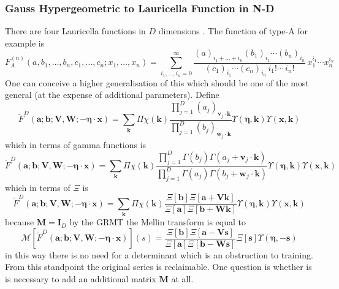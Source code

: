 \documentclass[journal=jcisd8,manuscript=article,layout=onecolumn,pdftex,floatfix,amsmath,amssymb,10pt]{achemso}
\begin{document}
\subsubsection{Gauss Hypergeometric to Lauricella Function in N-D}
There are four Lauricella functions in $D$ dimensions \cite{}. The function of type-A for example is
\begin{equation}
F_A^{(n)}(a, b_1,\ldots,b_n, c_1,\ldots,c_n; x_1,\ldots,x_n) = 
\sum_{i_1,\ldots,i_n=0}^{\infty} \frac{(a)_{i_1+\ldots+i_n} (b_1)_{i_1} \cdots (b_n)_{i_n}} {(c_1)_{i_1} \cdots (c_n)_{i_n} \,i_1! \cdots \,i_n!} \,x_1^{i_1} \cdots x_n^{i_n}
\end{equation}
One can conceive a higher generalisation of this which should be one of the most general (at the expense of additional parameters). Define
\begin{equation}
\tilde{F}^{D}(\mathbf{a};\mathbf{b};\mathbf{V,W};-\boldsymbol\eta \cdot\mathbf{x}) = \sum_{\mathbf{k}} \Pi\chi(\mathbf{k})\frac{\prod_{j=1}^D (a_j)_{\mathbf{v}_j \cdot \mathbf{k}}}{\prod_{j=1}^D (b_j)_{\mathbf{w}_j \cdot \mathbf{k}}} \Upsilon(\boldsymbol\eta,\mathbf{k})\Upsilon(\mathbf{x},\mathbf{k})
\end{equation}
which in terms of gamma functions is 
\begin{equation}
\tilde{F}^{D}(\mathbf{a};\mathbf{b};\mathbf{V,W};-\boldsymbol\eta \cdot\mathbf{x}) = \sum_{\mathbf{k}} \Pi\chi(\mathbf{k})\frac{\prod_{j=1}^D \Gamma(b_j)\Gamma(a_j + \mathbf{v}_j\cdot \mathbf{k})}{\prod_{j=1}^D \Gamma(a_j)\Gamma(b_j+\mathbf{w}_j\cdot \mathbf{k})} \Upsilon(\boldsymbol\eta,\mathbf{k})\Upsilon(\mathbf{x},\mathbf{k})
\end{equation}
which in terms of $\Xi$ is
\begin{equation}
\tilde{F}^{D}(\mathbf{a};\mathbf{b};\mathbf{V,W};-\boldsymbol\eta \cdot\mathbf{x}) = \sum_{\mathbf{k}} \Pi\chi(\mathbf{k})\frac{\Xi[\mathbf{b}]\Xi[\mathbf{a}+\mathbf{Vk}]}{\Xi[\mathbf{a}]\Xi[\mathbf{b+Wk}]} \Upsilon(\boldsymbol\eta,\mathbf{k})\Upsilon(\mathbf{x},\mathbf{k})
\end{equation}
because $\mathbf{M}=\mathbf{I}_D$ by the GRMT the Mellin transform is equal to \begin{equation}
\mathcal{M}[\tilde{F}^{D}(\mathbf{a};\mathbf{b};\mathbf{V,W};-\boldsymbol\eta \cdot\mathbf{x})](s) = \frac{\Xi[\mathbf{b}]\Xi[\mathbf{a}-\mathbf{Vs}]}{\Xi[\mathbf{a}]\Xi[\mathbf{b-Ws}]}\Xi[\mathbf{s}]\Upsilon(\boldsymbol\eta,-\mathbf{s})
\end{equation}
in this way there is no need for a determinant which is an obstruction to training. From this standpoint the original series is reclaimable. One question is whether is is necessary to add an additional matrix $\mathbf{M}$ at all.
\end{document}
